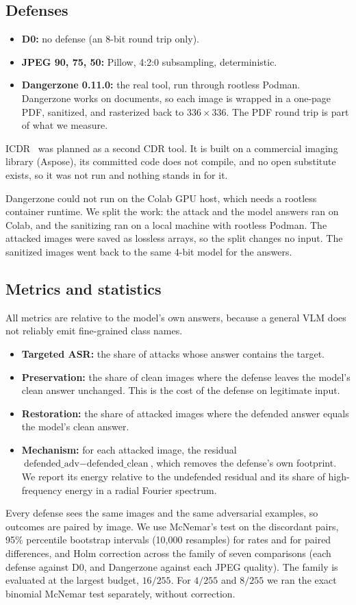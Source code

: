 \documentclass[11pt]{article}
\begin{document}
\subsection{Defenses}
\begin{itemize}
\item \textbf{D0:} no defense (an 8-bit round trip only).
\item \textbf{JPEG 90, 75, 50:} Pillow, 4:2:0 subsampling, deterministic.
\item \textbf{Dangerzone 0.11.0:} the real tool, run through rootless Podman. Dangerzone
works on documents, so each image is wrapped in a one-page PDF, sanitized, and
rasterized back to $336\times336$. The PDF round trip is part of what we measure.
\end{itemize}
ICDR~\cite{icdr,openimagecdr} was planned as a second CDR tool. It is built on a
commercial imaging library (Aspose), its committed code does not compile, and no open
substitute exists, so it was not run and nothing stands in for it.

Dangerzone could not run on the Colab GPU host, which needs a rootless container
runtime. We split the work: the attack and the model answers ran on Colab, and the
sanitizing ran on a local machine with rootless Podman. The attacked images were saved
as lossless arrays, so the split changes no input. The sanitized images went back to
the same 4-bit model for the answers.

\subsection{Metrics and statistics}
All metrics are relative to the model's own answers, because a general VLM does not
reliably emit fine-grained class names.
\begin{itemize}
\item \textbf{Targeted ASR:} the share of attacks whose answer contains the target.
\item \textbf{Preservation:} the share of clean images where the defense leaves the
model's clean answer unchanged. This is the cost of the defense on legitimate input.
\item \textbf{Restoration:} the share of attacked images where the defended answer
equals the model's clean answer.
\item \textbf{Mechanism:} for each attacked image, the residual
$\text{defended\_adv}-\text{defended\_clean}$, which removes the defense's own footprint.
We report its energy relative to the undefended residual and its share of
high-frequency energy in a radial Fourier spectrum.
\end{itemize}
Every defense sees the same images and the same adversarial examples, so outcomes are
paired by image. We use McNemar's test on the discordant pairs, 95\% percentile
bootstrap intervals (10,000 resamples) for rates and for paired differences, and Holm
correction across the family of seven comparisons (each defense against D0, and
Dangerzone against each JPEG quality). The family is evaluated at the largest budget,
$16/255$. For $4/255$ and $8/255$ we ran the exact binomial McNemar test separately,
without correction.
\end{document}
